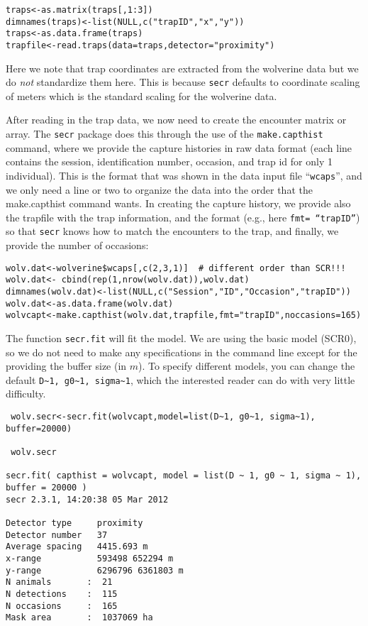 {{\begin{verbatim}
traps<-as.matrix(traps[,1:3])
dimnames(traps)<-list(NULL,c("trapID","x","y"))
traps<-as.data.frame(traps)
trapfile<-read.traps(data=traps,detector="proximity")
\end{verbatim}
}
Here we note that trap coordinates are extracted from the wolverine
data but we do {\it not} standardize them here. This is because
\mbox{\tt secr} defaults to coordinate scaling of meters which is the
standard scaling for the wolverine data. 

After reading in the trap data, we now need to create the encounter matrix
or array.  The \mbox{\tt secr} package does this through the use of the
\mbox{\tt make.capthist} command, where we provide the capture histories in raw
data format (each line contains the session, identification number,
occasion, and trap id for only 1 individual).  This is the format that
was shown in the data input file ``\mbox{\tt wcaps}'', and we only need a line or
two to organize the data into the order that the make.capthist command
wants.  In creating the capture history, we provide also the trapfile
with the trap information, and the format (e.g., here \mbox{\tt fmt= ``trapID''})
so that \mbox{\tt secr} knows how to match the encounters to the trap, and
finally, we provide the number of occasions:
{\small 
\begin{verbatim}
wolv.dat<-wolverine$wcaps[,c(2,3,1)]  # different order than SCR!!!
wolv.dat<- cbind(rep(1,nrow(wolv.dat)),wolv.dat)
dimnames(wolv.dat)<-list(NULL,c("Session","ID","Occasion","trapID"))
wolv.dat<-as.data.frame(wolv.dat)
wolvcapt<-make.capthist(wolv.dat,trapfile,fmt="trapID",noccasions=165)
\end{verbatim}
}
The function  \mbox{\tt secr.fit} will fit the model. We are using the
basic model (SCR0), so we do not need to make any specifications in
the command line except for the providing the buffer size (in $m$).  To
specify different models, you can change the default
\verb#D~1, g0~1, sigma~1#, which the interested reader can do with
very little difficulty.

{\small
\begin{verbatim}
 wolv.secr<-secr.fit(wolvcapt,model=list(D~1, g0~1, sigma~1), buffer=20000)

 wolv.secr

secr.fit( capthist = wolvcapt, model = list(D ~ 1, g0 ~ 1, sigma ~ 1), buffer = 20000 )
secr 2.3.1, 14:20:38 05 Mar 2012

Detector type     proximity 
Detector number   37 
Average spacing   4415.693 m 
x-range           593498 652294 m 
y-range           6296796 6361803 m 
N animals       :  21  
N detections    :  115 
N occasions     :  165 
Mask area       :  1037069 ha 


\end{verbatim}}}
